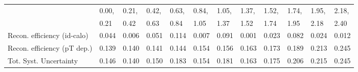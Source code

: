 \begin{tabular}{l|p{0.6cm}p{0.6cm}p{0.6cm}p{0.6cm}p{0.6cm}p{0.6cm}p{0.6cm}p{0.6cm}p{0.6cm}p{0.6cm}p{0.6cm}}
\hline
   & 0.00, & 0.21, & 0.42, & 0.63, & 0.84, & 1.05, & 1.37, & 1.52, & 1.74, & 1.95, & 2.18,  \\ 
   & 0.21 & 0.42 & 0.63 & 0.84 & 1.05 & 1.37 & 1.52 & 1.74 & 1.95 & 2.18 & 2.40  \\ 
\hline
Recon. efficiency (id-calo)              & 0.044 & 0.006 & 0.051 & 0.114 & 0.007 & 0.091 & 0.001 & 0.023 & 0.082 & 0.024 & 0.012 \\
\hline
Recon. efficiency (pT dep.)              & 0.139 & 0.140 & 0.141 & 0.144 & 0.154 & 0.156 & 0.163 & 0.173 & 0.189 & 0.213 & 0.245 \\
\hline
Tot. Syst. Uncertainty                   & 0.146 & 0.140 & 0.150 & 0.183 & 0.154 & 0.181 & 0.163 & 0.175 & 0.206 & 0.215 & 0.245 \\
\hline
\end{tabular}
